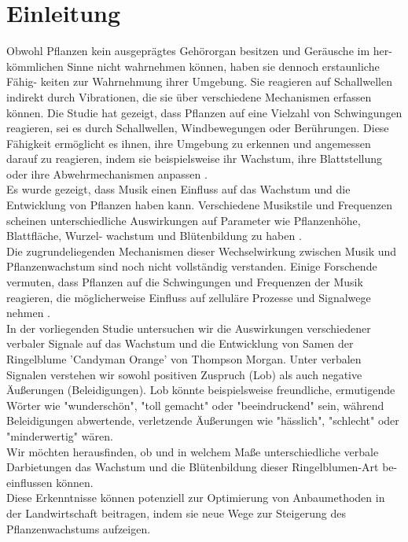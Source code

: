 \section{Einleitung}
   Obwohl Pflanzen kein ausgeprägtes Gehörorgan besitzen und Geräusche im her- kömmlichen Sinne nicht wahrnehmen können, haben sie dennoch erstaunliche Fähig- keiten zur Wahrnehmung ihrer Umgebung. Sie reagieren auf Schallwellen indirekt durch Vibrationen, die sie über verschiedene Mechanismen erfassen können. Die Studie hat gezeigt, dass Pflanzen auf eine Vielzahl von Schwingungen reagieren, sei es durch Schallwellen, Windbewegungen oder Berührungen. Diese Fähigkeit ermöglicht es ihnen, ihre Umgebung zu erkennen und angemessen darauf zu reagieren, indem sie beispielsweise ihr Wachstum, ihre Blattstellung oder ihre Abwehrmechanismen anpassen \cite{bachmann-wampfler2022}. \\
   
   Es wurde gezeigt, dass Musik einen Einfluss auf das Wachstum und die Entwicklung von Pflanzen haben kann. Verschiedene Musikstile und Frequenzen scheinen unterschiedliche Auswirkungen auf Parameter wie Pflanzenhöhe, Blattfläche, Wurzel- wachstum und Blütenbildung zu haben \cite{chowdhury-gupta2015}. \\
   
   Die zugrundeliegenden Mechanismen dieser Wechselwirkung zwischen Musik und Pflanzenwachstum sind noch nicht vollständig verstanden. Einige Forschende vermuten, dass Pflanzen auf die Schwingungen und Frequenzen der Musik reagieren, die möglicherweise Einfluss auf zelluläre Prozesse und Signalwege nehmen \cite{gagliano2013}. \\
   
   In der vorliegenden Studie untersuchen wir die Auswirkungen verschiedener verbaler Signale auf das Wachstum und die Entwicklung von Samen der Ringelblume 'Candyman Orange' von Thompson Morgan. Unter verbalen Signalen verstehen wir sowohl positiven Zuspruch (Lob) als auch negative Äußerungen (Beleidigungen). Lob könnte beispielsweise freundliche, ermutigende Wörter wie "wunderschön", "toll gemacht" oder "beeindruckend" sein, während Beleidigungen abwertende, verletzende Äußerungen wie "hässlich", "schlecht" oder "minderwertig" wären. \\
    
    Wir möchten herausfinden, ob und in welchem Maße unterschiedliche verbale Darbietungen das Wachstum und die Blütenbildung dieser Ringelblumen-Art be-einflussen können. \\

    Diese Erkenntnisse können potenziell zur Optimierung von Anbaumethoden in der Landwirtschaft beitragen, indem sie neue Wege zur Steigerung des Pflanzenwachstums aufzeigen.